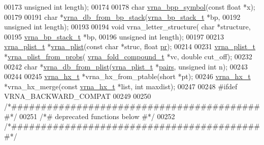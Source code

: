 \begin{DoxyCode}
00173                           \textcolor{keywordtype}{unsigned} \textcolor{keywordtype}{int} length);
00174 
00178 \textcolor{keywordtype}{char} \hyperlink{group__struct__utils_ga025bff1b27fa46534c8fae6980f64bb5}{vrna\_bpp\_symbol}(\textcolor{keyword}{const} \textcolor{keywordtype}{float} *x);
00179 
00191 \textcolor{keywordtype}{char} *\hyperlink{group__struct__utils_ga27bea2c241564af53a065982183389df}{vrna\_db\_from\_bp\_stack}(\hyperlink{group__data__structures_structvrna__bp__stack__s}{vrna\_bp\_stack\_t} *bp,
00192                             \textcolor{keywordtype}{unsigned} \textcolor{keywordtype}{int} length);
00193 
00194 \textcolor{keywordtype}{void} vrna\_letter\_structure( \textcolor{keywordtype}{char} *structure,
00195                             \hyperlink{group__data__structures_structvrna__bp__stack__s}{vrna\_bp\_stack\_t} *bp,
00196                             \textcolor{keywordtype}{unsigned} \textcolor{keywordtype}{int} length);
00197 
00213 \hyperlink{group__data__structures_structvrna__plist__s}{vrna\_plist\_t} *\hyperlink{group__struct__utils_gad4448f5d2c2da0e4ab1731a3586b2542}{vrna\_plist}(\textcolor{keyword}{const} \textcolor{keywordtype}{char} *struc, \textcolor{keywordtype}{float} \hyperlink{fold__vars_8h_ac98ec419070aee6831b44e5c700f090f}{pr});
00214 
00231 \hyperlink{group__data__structures_structvrna__plist__s}{vrna\_plist\_t} *\hyperlink{group__pf__fold_gaa3bf26a0ee2e9f2225afbaee44a37264}{vrna\_plist\_from\_probs}(
      \hyperlink{group__fold__compound_structvrna__fc__s}{vrna\_fold\_compound\_t} *vc, \textcolor{keywordtype}{double} cut\_off);
00232 
00242 \textcolor{keywordtype}{char} *\hyperlink{group__struct__utils_gab6a7a36c90836880f7ab09b9f6baf1af}{vrna\_db\_from\_plist}(\hyperlink{group__data__structures_structvrna__plist__s}{vrna\_plist\_t} *\hyperlink{group__struct__utils_ga6341cbb704924824e0236c1dce791032}{pairs}, \textcolor{keywordtype}{unsigned} \textcolor{keywordtype}{int} n);
00243 
00244 
00245 \hyperlink{group__struct__utils_structvrna__hx__s}{vrna\_hx\_t} *vrna\_hx\_from\_ptable(\textcolor{keywordtype}{short} *pt);
00246 \hyperlink{group__struct__utils_structvrna__hx__s}{vrna\_hx\_t} *vrna\_hx\_merge(\textcolor{keyword}{const} \hyperlink{group__struct__utils_structvrna__hx__s}{vrna\_hx\_t} *list, \textcolor{keywordtype}{int} maxdist);
00247 
00248 \textcolor{preprocessor}{#ifdef  VRNA\_BACKWARD\_COMPAT}
00249 
00250 \textcolor{comment}{/*###########################################*/}
00251 \textcolor{comment}{/*# deprecated functions below              #*/}
00252 \textcolor{comment}{/*###########################################*/}

\end{DoxyCode}
